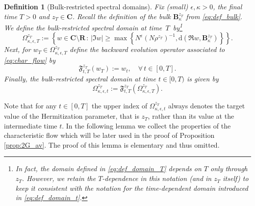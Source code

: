\documentclass[10pt]{amsart}
\newtheorem{definition}[theorem]{Definition}
\numberwithin{equation}{section}
\newcommand{\R}{\mathbf{R}}
\newcommand{\C}{\mathbf{C}}
\begin{document}
\begin{definition}[Bulk-restricted spectral domains]\label{def:spec_dom} Fix (small) $\epsilon, \kappa>0$, the final time $T>0$ and $z_{T}\in \C$. Recall the definition of the bulk $\mathbf{B}^{z_T}_\kappa$ from \eqref{eq:def_bulk}. We define the \emph{bulk-restricted spectral domain} at time~$T$~by\footnote{In fact, the domain defined in \eqref{eq:def_domain_T} depends on $T$ only through $z_T$. However, we retain the $T$-dependence in this notation (and in $z_T$ itself) to keep it consistent with the notation for the time-dependent domain introduced in \eqref{eq:def_domain_t}.}
\begin{equation}
\Omega_{\kappa,\epsilon,T}^{z_{T}}:=\left\lbrace w\in\C\setminus\R\,:\, |\Im w|\ge \max \left\lbrace N^{\epsilon}(N\rho^{z_{T}})^{-1}, \mathrm{d}(\Re w, \mathbf{B}^{z_{T}}_\kappa)\right\rbrace\right\rbrace.
\label{eq:def_domain_T}
\end{equation}
Next, for $w_{T}\in \Omega_{\kappa,\epsilon,T}^{z_{T}}$ define the backward evolution operator associated to \eqref{eq:char_flow} by 
\begin{equation}
\mathfrak{F}_{t,T}^{z_{T}}(w_{T}):=w_{t},\quad \forall\, t\in [0,T].
\end{equation}
Finally, the bulk-restricted spectral domain at time $t\in [0,T)$ is given by
\begin{equation}
\Omega_{\kappa,\epsilon,t}^{z_{T}}:=\mathfrak{F}_{t,T}^{z_{T}}\left(\Omega_{\kappa,\epsilon,T}^{z_{T}}\right).
\label{eq:def_domain_t}
\end{equation}
\end{definition}


Note that for any $t\in [0,T]$ the upper index of $\Omega_{\kappa,\epsilon,t}^{z_{T}}$ always denotes the target value of the Hermitization parameter, that is $z_{T}$, rather than its value at the intermediate time $t$.  In the following lemma we collect the properties of the characteristic flow which will be later used in the proof of Proposition \ref{prop:2G_av}. The proof of  this lemma is elementary and thus omitted.
\end{document}

